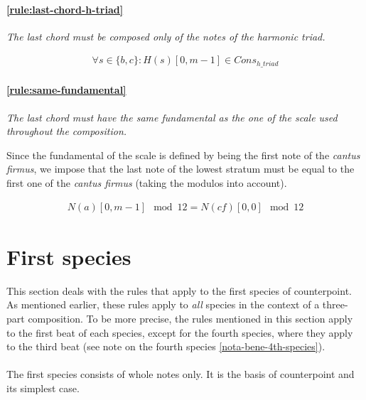     \paragraph{\hspace{0.6cm}\ref{rule:last-chord-h-triad}} \textit{The last chord must be composed only of the notes of the harmonic triad.} 
    
    \begin{equation} \begin{aligned}
    \forall s \in \{b, c\} \colon H(s)[0, m-1] \in Cons_{h\_triad}
    \end{aligned} \end{equation}

    \paragraph{\hspace{0.6cm}\ref{rule:same-fundamental}} \textit{The last chord must have the same fundamental as the one of the scale used throughout the composition.}\label{constraint:same-fundamental}

    Since the fundamental of the scale is defined by being the first note of the \textit{cantus firmus}, we impose that the last note of the lowest stratum must be equal to the first one of the \textit{cantus firmus} (taking the modulos into account).
    
    
    \begin{equation} \begin{aligned}
    N(a)[0, m-1] \mod 12 = N(cf)[0, 0] \mod 12
    \end{aligned} \end{equation}

\section{First species}
This section deals with the rules that apply to the first species of counterpoint. As mentioned earlier, these rules apply to \textit{all} species in the context of a three-part composition. To be more precise, the rules mentioned in this section apply to the first beat of each species, except for the fourth species, where they apply to the third beat (see note on the fourth species \ref{nota-bene-4th-species}).

\paragraph{}
The first species consists of whole notes only. It is the basis of counterpoint and its simplest case. 

